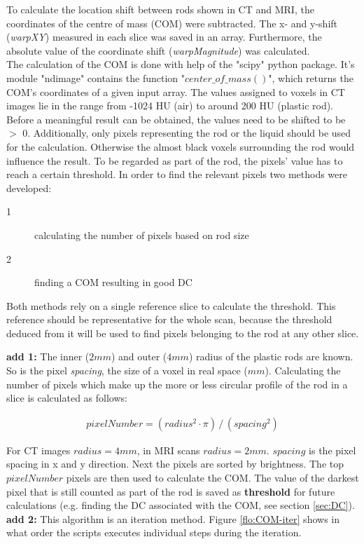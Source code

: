 To calculate the location shift between rods shown in CT and MRI, the coordinates of the centre of mass (COM) were subtracted.
The x- and y-shift (\textit{warpXY}) measured in each slice was saved in an array.
Furthermore, the absolute value of the coordinate shift (\textit{warpMagnitude}) was calculated.
\\
The calculation of the COM is done with help of the "scipy" python package.
It's module "ndimage" contains the function "$center\_of\_mass()$", which returns the COM's coordinates of a given input array.
The values assigned to voxels in CT images lie in the range from -1024 HU (air) to around 200 HU (plastic rod).
Before a meaningful result can be obtained, the values need to be shifted to be $>$ 0.
Additionally, only pixels representing the rod or the liquid should be used for the calculation.
Otherwise the almost black voxels surrounding the rod would influence the result.
To be regarded as part of the rod, the pixels' value has to reach a certain threshold.
In order to find the relevant pixels two methods were developed:

\begin{description}
 \item[1] calculating the number of pixels based on rod size
 \item[2] finding a COM resulting in good DC
\end{description}

Both methods rely on a single reference slice to calculate the threshold.
This reference should be representative for the whole scan, because the threshold deduced from it will be used to find pixels belonging to the rod at any other slice.

\textbf{add 1:}
The inner ($2mm$) and outer ($4mm$) radius of the plastic rods are known.
So is the pixel \textit{spacing}, the size of a voxel in real space ($mm$).
Calculating the number of pixels which make up the more or less circular profile of the rod in a slice is calculated as follows:

\begin{align}
 pixelNumber = (radius^2 \cdot \pi) \, / \, (spacing^2)
\end{align}

For CT images $radius = 4mm$, in MRI scans $radius = 2mm$. $spacing$ is the pixel spacing in x and y direction.
Next the pixels are sorted by brightness. The top $pixelNumber$ pixels are then used to calculate the COM.
The value of the darkest pixel that is still counted as part of the rod is saved as \textbf{threshold} for future calculations (e.g. finding the DC associated with the COM, see section \ref{sec:DC}).
\textbf{add 2:}
This algorithm is an iteration method.
Figure \ref{flo:COM-iter} shows in what order the scripts executes individual steps during the iteration.

